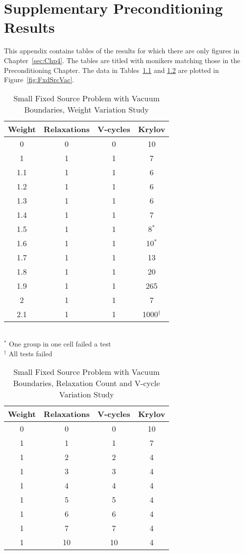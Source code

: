 
\chapter{Supplementary Preconditioning Results}
\label{sec:AppendixD}
This appendix contains tables of the results for which there are only figures in Chapter~\ref{sec:Chp4}. The tables are titled with monikers matching those in the Preconditioning Chapter. The data in Tables~\ref{table:FxdSrcTstVacWeight} and \ref{table:FxdSrcTstVacRV} are plotted in Figure~\ref{fig:FxdSrcVac}.
\begin{table}[!h]
\caption{Small Fixed Source Problem with Vacuum Boundaries, Weight Variation Study}
\begin{center}
\begin{tabular}{| c | c | c | c |}
\hline 
Weight & Relaxations & V-cycles & Krylov \\[0.5ex]
\hline
0    & 0 & 0 & 10 \\
1    & 1 & 1 & 7 \\
1.1 & 1 & 1 & 6 \\
1.2 & 1 & 1 & 6 \\
1.3 & 1 & 1 & 6 \\
1.4 & 1 & 1 & 7 \\
1.5 & 1 & 1 & 8$^{*}$ \\
1.6 & 1 & 1 & 10$^{*}$ \\
1.7 & 1 & 1 & 13 \\
1.8 & 1 & 1 & 20 \\
1.9 & 1 & 1 & 265 \\
2    & 1 & 1 & 7 \\
2.1 & 1 & 1 & 1000$^{\dagger}$ \\
\hline 
\end{tabular} \\
$^{*}$ One group in one cell failed a test \\
$^{\dagger}$ All tests failed
\end{center}
\label{table:FxdSrcTstVacWeight}
\end{table}

\begin{table}[!h]
\caption{Small Fixed Source Problem with Vacuum Boundaries, Relaxation Count and V-cycle Variation Study}
\begin{center}
\begin{tabular}{|c| c| c| c|}
\hline
Weight & Relaxations & V-cycles & Krylov \\[0.5ex]
\hline
0  & 0 & 0 & 10 \\
1 & 1 & 1 & 7 \\
1 & 2 & 2 & 4 \\
1 & 3 & 3 & 4 \\
1 & 4 & 4 & 4 \\
1 & 5 & 5 & 4 \\
1 & 6 & 6 & 4 \\
1 & 7 & 7 & 4 \\
1 & 10 & 10 & 4 \\
\hline 
\end{tabular}
\end{center}
\label{table:FxdSrcTstVacRV}
\end{table}

